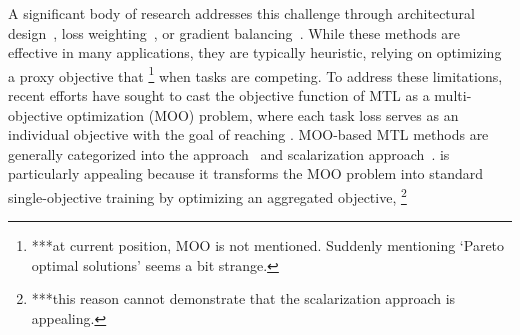 \documentclass[sigconf]{acmart}
\begin{document}
A significant body of research addresses this challenge through architectural design~\cite{liu2019end,misra2016cross}, loss weighting~\cite{kendall2018multi,vandenhende2021multi}, or gradient balancing~\cite{chen2018gradnorm,guo2018dynamic}. While these methods are effective in many applications, they are typically heuristic, relying on optimizing a proxy objective that \footnote{***at current position, MOO is not mentioned. Suddenly mentioning `Pareto optimal solutions' seems a bit strange. } when tasks are competing.
To address these limitations, recent efforts have sought to 
cast the objective function of MTL as a multi-objective optimization (MOO) problem, where each task loss serves as an individual objective with the goal of reaching . MOO-based MTL methods are generally categorized into the  approach~\cite{sener2018multi} and scalarization approach~\cite{lin2024smooth}.   is particularly appealing because it transforms the MOO problem into standard single-objective training by optimizing an aggregated objective, \footnote{***this reason cannot demonstrate that the scalarization approach is appealing. }
\end{document}

